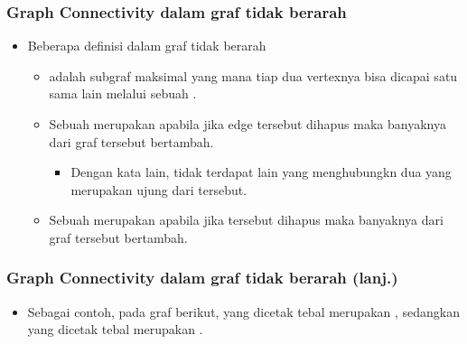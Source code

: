 \begin{frame}
\frametitle{Graph Connectivity dalam graf tidak berarah}
\begin{itemize}
  \item Beberapa definisi dalam graf tidak berarah
  \begin{itemize}
    \item {} adalah subgraf maksimal yang mana tiap dua vertexnya bisa dicapai satu sama lain melalui sebuah \fpath.
    \item Sebuah \fedge merupakan  apabila jika edge tersebut dihapus maka banyaknya \fconnectedcomponent dari graf tersebut bertambah.
    \begin{itemize}
      \item Dengan kata lain, tidak terdapat \fpath lain yang menghubungkn dua \fnode yang merupakan ujung dari \fedge tersebut.
    \end{itemize}
    \item Sebuah \fnode merupakan  apabila jika \fnode tersebut dihapus maka banyaknya \fconnectedcomponent dari graf tersebut bertambah.
  \end{itemize}
\end{itemize}
\end{frame}

\begin{frame}
\frametitle{Graph Connectivity dalam graf tidak berarah (lanj.)}
\begin{itemize}
  \item Sebagai contoh, pada graf berikut, \fedge yang dicetak tebal merupakan \fbridge, sedangkan \fnode yang dicetak tebal merupakan \farticulationpoint.
\end{itemize}
\begin{figure}[!h]
\centering
\end{figure}
\end{frame}

